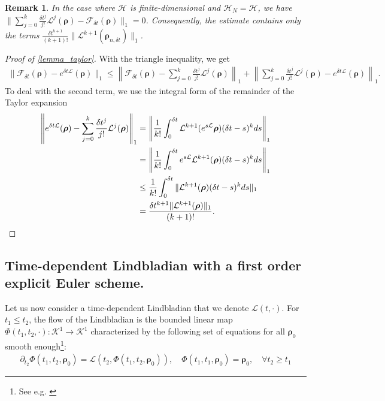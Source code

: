 \documentclass[a4paper,onecolumn,amsmath,amssymb,amsfonts,accepted=2026-03-06]{quantumarticle}
\newcommand{\xL}{\mathcal{L}}
\newcommand{\xH}{\mathcal{H}}
\newcommand{\xF}{\mathcal{F}}
\newcommand{\xK}{\mathcal{K}}
\newtheorem{remark}{Remark}
\begin{document}
\begin{remark}
    In the case where $\xH$ is finite-dimensional and $\xH_N = \xH$, we have $\| \sum_{j=0}^{k} \frac{\delta t^j}{j!} \xL^j(\boldsymbol{\rho}) - \xF_{\delta t}(\boldsymbol{\rho}) \|_1 = 0$. Consequently, the estimate contains only the terms $\frac{\delta t^{k+1}}{(k+1)!} \|\xL^{k+1}(\boldsymbol{\rho}_{n,\delta t})\|_1$.
\end{remark}
\begin{proof}[Proof of \cref{lemma_taylor}]
    With the triangle inequality, we get
    \begin{align}\|\xF_{\delta t}(\boldsymbol{\rho})-e^{\delta t \xL}(\boldsymbol{\rho})\|_1 \leq \left\|\xF_{\delta t}(\boldsymbol{\rho})-\sum_{j=0}^{k} \frac{\delta t^j}{j!}\xL^j(\boldsymbol{\rho})\right\|_1 +  \left\|\sum_{j=0}^{k} \frac{\delta t^j}{j!}\xL^j(\boldsymbol{\rho}) - e^{\delta t \xL}(\boldsymbol{\rho})\right\|_1.
    \end{align}
    To deal with the second term, we use the integral form of the remainder of the Taylor expansion
    \begin{align}
        \notag \left\|e^{\delta t \xL}(\boldsymbol{\rho})- \sum_{j=0}^{k} \frac{\delta t^j}{j!}\xL^j(\boldsymbol{\rho})\right\|_1& = \left\|\frac{1}{k!}\int_0^{\delta t} \xL^{k+1}(e^{s\xL}\boldsymbol{\rho})(\delta t-s)^k ds\right\|_1\\
        \notag &= \left\|\frac{1}{k!}\int_0^{\delta t} e^{s\xL}\xL^{k+1}(\boldsymbol{\rho})(\delta t-s)^k ds\right\|_1\\
        \notag &\leq \frac{1}{k!}\int_0^{\delta t}\| \xL^{k+1}(\boldsymbol{\rho})(\delta t-s)^k ds\|_1\\
        &=\frac{\delta t^{k+1}\|\xL^{k+1}(\boldsymbol{\rho})\|_1}{(k+1)!}.
    \end{align}
\end{proof}

\subsection{Time-dependent Lindbladian with a first order explicit Euler scheme.}
\label{subsubsec_time_dep}
Let us now consider a time-dependent Lindbladian that we denote $\xL(t,\cdot)$. For $t_1 \leq t_2$, the flow of the Lindbladian is the bounded linear map $\Phi(t_1,t_2,\cdot): \xK^1\to \xK^1$ characterized by the following set of equations for all $\boldsymbol{\rho}_0$ smooth enough\footnote{See e.g. \cite[Section 3.2]{gondolfEnergyPreservingEvolutions2023}}:
\begin{align}
    \label{eq_lind_time_dependant}
    \partial_{t_2}\Phi(t_1,t_2,\boldsymbol{\rho}_0)=\xL(t_2,\Phi(t_1,t_2,\boldsymbol{\rho}_0)), \quad \Phi(t_1,t_1,\boldsymbol{\rho}_0)=\boldsymbol{\rho}_0, \quad \forall t_2 \geq t_1
\end{align}
\end{document}
